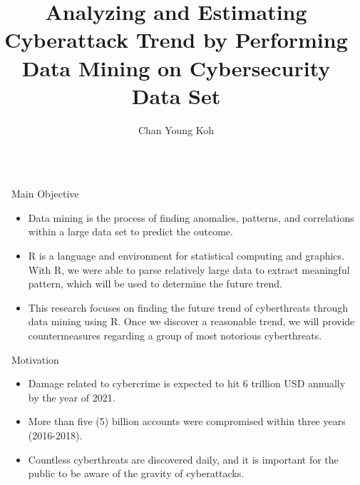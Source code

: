 \documentclass[final]{beamer}
\title{Analyzing and Estimating Cyberattack Trend by Performing Data Mining on Cybersecurity Data Set}
\author{Chan Young Koh}
\institute{Bridgewater State University\samelineand(Mentor: Dr. Enping Li)}
\newlength{\sepwidth}
\newlength{\colwidth}
\newcommand{\separatorcolumn}{\begin{column}{\sepwidth}\end{column}}
\begin{document}
\begin{frame}[t]
\begin{columns}[t]
\separatorcolumn

\begin{column}{\colwidth}

  \begin{block}{Main Objective}
  
    \begin{itemize}
        
  
        \item Data mining is the process of finding anomalies, patterns, and correlations within a large data set to predict the outcome. 
        
        \item R is a language and environment for statistical computing and graphics. With R, we were able to parse relatively large data to extract meaningful pattern, which will be used to determine the future trend. 
        
        \item This research focuses on finding the future trend of cyberthreats through data mining using R. Once we discover a reasonable trend, we will provide countermeasures regarding a group of most notorious cyberthreats. 
    
    \end{itemize}

  \end{block}

  \begin{block}{Motivation}

    \begin{itemize}
        \item Damage related to cybercrime is expected to hit 6 trillion USD annually by the year of 2021. 
        \item More than five (5) billion accounts were compromised within three years (2016-2018). 
        \item Countless cyberthreats are discovered daily, and it is important for the public to be aware of the gravity of cyberattacks. 
    \end{itemize}

   

  \end{block}
  

\end{column}
\end{columns}
\end{frame}
\end{document}
